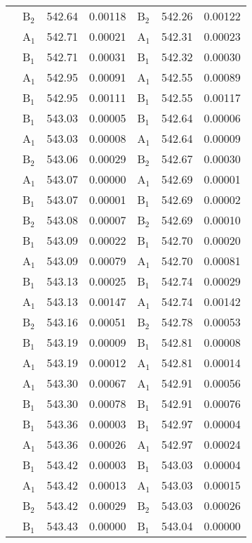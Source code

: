 \documentclass[journal=jctcce,manuscript=article]{achemso}
\begin{document}
\begin{table}
\begin{tabular}{l|lcc|lcc}
& B$_2$ & 542.64 & 0.00118      & B$_2$ & 542.26 & 0.00122 \\
& A$_1$ & 542.71 & 0.00021      & A$_1$ & 542.31 & 0.00023 \\
& B$_1$ & 542.71 & 0.00031      & B$_1$ & 542.32 & 0.00030 \\
& A$_1$ & 542.95 & 0.00091      & A$_1$ & 542.55 & 0.00089 \\
& B$_1$ & 542.95 & 0.00111      & B$_1$ & 542.55 & 0.00117 \\
& B$_1$ & 543.03 & 0.00005      & B$_1$ & 542.64 & 0.00006 \\
& A$_1$ & 543.03 & 0.00008      & A$_1$ & 542.64 & 0.00009 \\
& B$_2$ & 543.06 & 0.00029      & B$_2$ & 542.67 & 0.00030 \\
& A$_1$ & 543.07 & 0.00000      & A$_1$ & 542.69 & 0.00001 \\
& B$_1$ & 543.07 & 0.00001      & B$_1$ & 542.69 & 0.00002 \\
& B$_2$ & 543.08 & 0.00007      & B$_2$ & 542.69 & 0.00010 \\
& B$_1$ & 543.09 & 0.00022      & B$_1$ & 542.70 & 0.00020 \\
& A$_1$ & 543.09 & 0.00079      & A$_1$ & 542.70 & 0.00081 \\
& B$_1$ & 543.13 & 0.00025      & B$_1$ & 542.74 & 0.00029 \\
& A$_1$ & 543.13 & 0.00147      & A$_1$ & 542.74 & 0.00142 \\
& B$_2$ & 543.16 & 0.00051      & B$_2$ & 542.78 & 0.00053 \\
& B$_1$ & 543.19 & 0.00009      & B$_1$ & 542.81 & 0.00008 \\
& A$_1$ & 543.19 & 0.00012      & A$_1$ & 542.81 & 0.00014 \\
& A$_1$ & 543.30 & 0.00067      & A$_1$ & 542.91 & 0.00056 \\
& B$_1$ & 543.30 & 0.00078      & B$_1$ & 542.91 & 0.00076 \\
& B$_1$ & 543.36 & 0.00003      & B$_1$ & 542.97 & 0.00004 \\
& A$_1$ & 543.36 & 0.00026      & A$_1$ & 542.97 & 0.00024 \\
& B$_1$ & 543.42 & 0.00003      & B$_1$ & 543.03 & 0.00004 \\
& A$_1$ & 543.42 & 0.00013      & A$_1$ & 543.03 & 0.00015 \\
& B$_2$ & 543.42 & 0.00029      & B$_2$ & 543.03 & 0.00026 \\
& B$_1$ & 543.43 & 0.00000      & B$_1$ & 543.04 & 0.00000 \\

\end{tabular}
\end{table}
\end{document}
